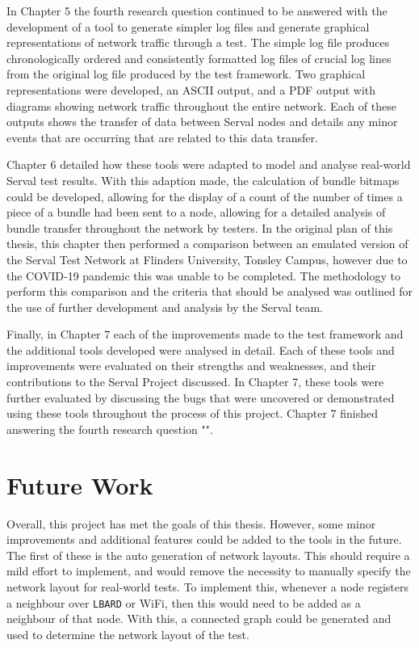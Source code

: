 In Chapter 5 the fourth research question continued to be answered with the development of a tool to generate simpler log files and generate graphical representations of network traffic through a test.
The simple log file produces chronologically ordered and consistently formatted log files of crucial log lines from the original log file produced by the test framework.
Two graphical representations were developed, an ASCII output, and a PDF output with diagrams showing network traffic throughout the entire network.
Each of these outputs shows the transfer of data between Serval nodes and details any minor events that are occurring that are related to this data transfer.

Chapter 6 detailed how these tools were adapted to model and analyse real-world Serval test results.
With this adaption made, the calculation of bundle bitmaps could be developed, allowing for the display of a count of the number of times a piece of a bundle had been sent to a node, allowing for a detailed analysis of bundle transfer throughout the network by testers.
In the original plan of this thesis, this chapter then performed a comparison between an emulated version of the Serval Test Network at Flinders University, Tonsley Campus, however due to the COVID-19 pandemic this was unable to be completed.
The methodology to perform this comparison and the criteria that should be analysed was outlined for the use of further development and analysis by the Serval team.

Finally, in Chapter 7 each of the improvements made to the test framework and the additional tools developed were analysed in detail.
Each of these tools and improvements were evaluated on their strengths and weaknesses, and their contributions to the Serval Project discussed.
In Chapter 7, these tools were further evaluated by discussing the bugs that were uncovered or demonstrated using these tools throughout the process of this project.
Chapter 7 finished answering the fourth research question "\fourthRQ".



\section{Future Work}
\label{section:futureWork}
Overall, this project has met the goals of this thesis.
However, some minor improvements and additional features could be added to the tools in the future.
The first of these is the auto generation of network layouts.
This should require a mild effort to implement, and would remove the necessity to manually specify the network layout for real-world tests.
To implement this, whenever a node registers a neighbour over \texttt{LBARD} or WiFi, then this would need to be added as a neighbour of that node.
With this, a connected graph could be generated and used to determine the network layout of the test.

